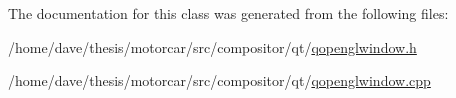 The documentation for this class was generated from the following files\-:\begin{DoxyCompactItemize}
\item 
/home/dave/thesis/motorcar/src/compositor/qt/\hyperlink{qopenglwindow_8h}{qopenglwindow.\-h}\item 
/home/dave/thesis/motorcar/src/compositor/qt/\hyperlink{qopenglwindow_8cpp}{qopenglwindow.\-cpp}\end{DoxyCompactItemize}
